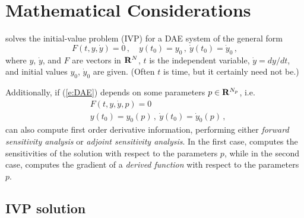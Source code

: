 \chapter{Mathematical Considerations}\label{s:math}

{\idas} solves the initial-value problem (IVP) for a DAE system of the
general form
\begin{equation}\label{e:DAE}
  F(t,y,\dot{y}) = 0 \, ,
  \quad y(t_0) = y_0 \, ,~ \dot{y}(t_0) = \dot{y}_0 \, ,
\end{equation}
where $y$, $\dot{y}$, and $F$ are vectors in ${\bf R}^N$, $t$ is the independent
variable, $\dot{y} = dy/dt$, and initial values $y_0$, $\dot{y}_0$
are given.  (Often $t$ is time, but it certainly need not be.)

Additionally, if (\ref{e:DAE}) depends on some parameters $p \in {\bf R}^{N_p}$,
i.e.
\begin{equation}\label{e:DAE_p}
\begin{split}
& F(t, y, \dot y , p) = 0 \\
& y(t_0) = y_0(p) \, ,~ {\dot y}(t_0) = \dot y_0(p) \, ,
\end{split}
\end{equation}
{\idas} can also compute first order derivative information, performing either
{\em forward sensitivity analysis} or {\em adjoint sensitivity analysis}.
In the first case, {\idas} computes the sensitivities of the
solution with respect to the parameters $p$, while in the second case,
{\idas} computes the gradient of a {\em derived function} with
respect to the parameters $p$.


\section{IVP solution}\label{ss:ivp_sol}

